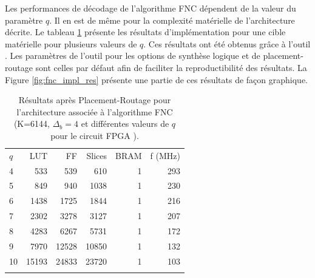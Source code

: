 Les performances de décodage de l'algorithme FNC dépendent de la valeur du paramètre $q$. Il en est de même pour la
complexité matérielle de l'architecture décrite. Le tableau \ref{tab:fnc_impl_res_4} présente les résultats 
d'implémentation pour une cible matérielle   pour plusieurs valeurs de $q$. Ces
résultats ont été obtenus grâce à l'outil . Les paramètres de l'outil pour les options de synthèse logique
et de placement-routage sont celles par défaut afin de faciliter la reproductibilité des résultats. La Figure \ref{fig:fnc_impl_res} présente une partie de ces résultats de façon graphique.

\begin{table}[!tb]
	\centering
	\caption{Résultats après Placement-Routage pour l'architecture associée à l'algorithme FNC (K=6144, 
	$\Delta_b = 4$ et différentes valeurs de $q$ pour le circuit FPGA  ). }
	\label{tab:fnc_impl_res_4}
	\begin{tabular}{lrrrrr} 
		\toprule
		$q$ & LUT   & FF    & Slices & BRAM & f (MHz) \\ 	\cmidrule(r){1-1}\cmidrule(l){2-6}
		4   &  533  &  539  & 610    & 1	& 293     \\
		5   &  849  &  940  & 1038   & 1	& 230     \\
		6   & 1438  & 1725  & 1844   & 1    & 216     \\
		7   & 2302  & 3278  & 3127   & 1	& 207     \\
		8   & 4283  & 6267  & 5731   & 1    & 172     \\
		9   & 7970	& 12528 & 10850  & 1    & 132     \\
		10  & 15193 & 24833 & 23720  & 1    & 103     \\
		\bottomrule \vspace*{1em}
	\end{tabular}
\end{table}

